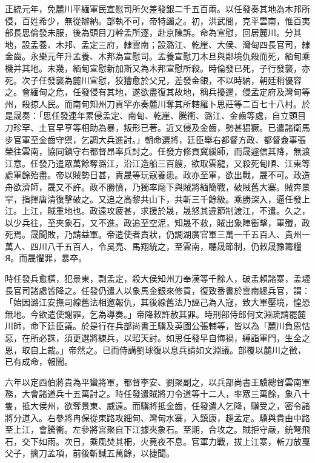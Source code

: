 \begin{pinyinscope}
正統元年，免麓川平緬軍民宣慰司所欠差發銀二千五百兩。以任發奏其地為木邦所侵，百姓希少，無從辦納。部執不可，帝特蠲之。初，洪武間，克平雲南，惟百夷部長思倫發未服，後為頭目刀幹孟所逐，赴京陳訴。命為宣慰，回居麓川。分其地，設孟養、木邦、孟定三府，隸雲南；設潞江、乾崖、大侯、灣甸四長官司，隸金齒。永樂元年升孟養、木邦為宣慰司。孟養宣慰刀木旦與鄰境仇殺而死，緬甸乘機并其地。未幾，緬甸宣慰新加斯又為木邦宣慰所殺。時倫發已死，子行發襲，亦死。次子任發襲為麓川宣慰，狡獪愈於父兄，差發金銀，不以時納，朝廷稍優容之。會緬甸之危，任發侵有其地，遂欲盡復其故地，稱兵擾邊，侵孟定府及灣甸等州，殺掠人民。而南甸知州刀貢罕亦奏麓川奪其所轄羅卜思莊等二百七十八村。於是晟奏：「思任發連年累侵孟定、南甸、乾崖、騰衝、潞江、金齒等處，自立頭目刀珍罕、土官早亨等相助為暴，叛形已著。近又侵及金齒，勢甚猖獗。已遣諸衛馬步官軍至金齒守禦，乞調大兵進討。」朝命選將，廷臣舉右都督方政、都督僉事張榮往雲南，協同鎮守右都督昂率兵討之。任發方修貢冀緩師，而晟遽信其降，無渡江意。任發乃遣眾萬餘奪潞江，沿江造船三百艘，欲取雲龍，又殺死甸順、江東等處軍餘殆盡。帝以賊勢日甚，責晟等玩寇養患。政亦至軍，欲出戰，晟不可。政造舟欲濟師，晟又不許。政不勝憤，乃獨率麾下與賊將緬簡戰，破賊舊大寨。賊奔景罕，指揮唐清復擊破之。又追之高黎共山下，共斬三千餘級。乘勝深入，逼任發上江。上江，賊重地也。政遠攻疲甚，求援於晟，晟怒其違節制渡江，不遣。久之，以少兵往，至夾象石，又不進。政追至空泥，知晟不救，賊出象陣衝擊，軍殲，政死焉。晟聞敗，乃請益軍。帝遣使者責狀，仍調湖廣官軍三萬一千五百人、貴州一萬人、四川八千五百人，令吳亮、馬翔統之，至雲南，聽晟節制，仍敕晟豫籌糧Я。而晟懼罪，暴卒。

時任發兵愈橫，犯景東，剽孟定，殺大侯知州刀奉漢等千餘人，破孟賴諸寨，孟璉長官司諸處皆降之。任發仍遣人以象馬金銀來修貢，復致番書於雲南總兵官，謂：「始因潞江安撫司線舊法相邀報仇，其後線舊法乃誣己為入寇，致大軍壓境，惶恐無地。今欲遣使謝罪，乞為導奏。」帝降敕許赦其罪。時刑部侍郎何文淵疏請罷麓川師，命下廷臣議。於是行在兵部尚書王驥及英國公張輔等，皆以為「麓川負恩怙惡，在所必誅，須更選將練兵，以昭天討。如思任發早自悔禍，縛詣軍門，生全之恩，取自上裁。」帝然之。已而侍講劉球復以息兵請如文淵議。部覆以麓川之徵，已有成命，報聞。

六年以定西伯蔣貴為平蠻將軍，都督李安、劉聚副之，以兵部尚書王驥總督雲南軍務，大會諸道兵十五萬討之。時任發遣賊將刀令道等十二人，率眾三萬餘，象八十隻，抵大侯州，欲奪景東、威遠。而驥將抵金齒，任發遣人乞降，驥受之，密令諸將分道入。右參將冉保從東路攻細甸、灣甸水寨，入鎮康，趨孟定。驥與貴由中路至上江，會騰衝。左參將宮聚自下江據夾象石。至期，合攻之。賊拒守嚴，銃弩飛石，交下如雨。次日，乘風焚其柵，火竟夜不息。官軍力戰，拔上江寨，斬刀放戛父子，擒刀孟項，前後斬馘五萬餘，以捷聞。


\end{pinyinscope}
